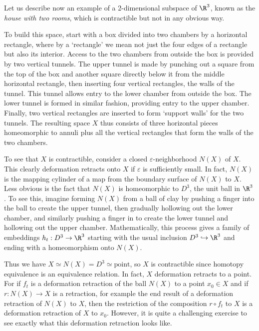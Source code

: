 \begin{example}
\label{ex:house-with-two-rooms-contractible}
Let us describe now an example of a 2-dimensional subspace of $\R^3$, known as
the \textit{house with two rooms}, which is contractible but not in any obvious way.



To build this space, start with a box divided into two chambers by a horizontal
rectangle, where by a `rectangle' we mean not just the four edges of a rectangle but
also its interior. Access to the two chambers from outside the box is provided by two
vertical tunnels. The upper tunnel is made by punching out a square from the top of the
box and another square directly below it from the middle horizontal rectangle, then
inserting four vertical rectangles, the walls of the tunnel. This tunnel allows entry to
the lower chamber from outside the box. The lower tunnel is formed in similar fashion,
providing entry to the upper chamber. Finally, two vertical rectangles are inserted to
form `support walls' for the two tunnels. The resulting space $X$ thus consists of three
horizontal pieces homeomorphic to annuli plus all the vertical rectangles that form the
walls of the two chambers.

To see that $X$ is contractible, consider a closed $\varepsilon$-neighborhood $N(X)$ of $X$.
This clearly deformation retracts onto $X$ if $\varepsilon$ is sufficiently small. In fact, $N(X)$
is the mapping cylinder of a map from the boundary surface of $N(X)$ to $X$. Less
obvious is the fact that $N(X)$ is homeomorphic to $D^3$, the unit ball in $\R^3$. To see
this, imagine forming $N(X)$ from a ball of clay by pushing a finger into the ball to
create the upper tunnel, then gradually hollowing out the lower chamber, and similarly
pushing a finger in to create the lower tunnel and hollowing out the upper chamber.
Mathematically, this process gives a family of embeddings $h_t : D^3 \to \R^3$ starting with
the usual inclusion $D^3 \hookrightarrow \R^3$ and ending with a homeomorphism onto $N(X)$.

Thus we have $X \simeq N(X) = D^3 \simeq \text{point}$, so $X$ is contractible since homotopy
equivalence is an equivalence relation. In fact, $X$ deformation retracts to a point. For
if $f_t$ is a deformation retraction of the ball $N(X)$ to a point $x_0 \in X$ and if
$r : N(X) \to X$ is a retraction, for example the end result of a deformation retraction
of $N(X)$ to $X$, then the restriction of the composition $r \circ f_t$ to $X$ is a deformation
retraction of $X$ to $x_0$. However, it is quite a challenging exercise to see exactly what
this deformation retraction looks like.
\end{example}

